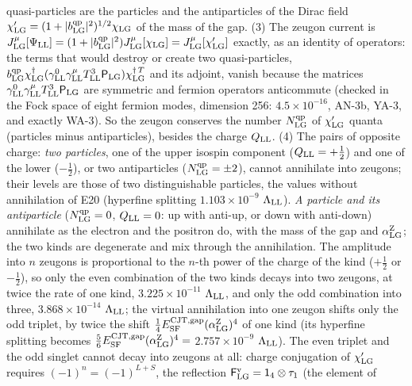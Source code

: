 \documentclass[
  10pt,
]{article}
\begin{document}
\begin{longtable}[]
quasi-particles are the particles and the antiparticles of the Dirac
field
\(\chi'_{\rm LG}=(1+\lvert b^{\rm qp}_{\rm LG}\rvert^2)^{1/2}\chi_{\rm LG}\)
of the mass of the gap. (3) The zeugon current is
\(J^\mu_{\rm LG}[\Psi_{\rm LL}]=(1+\lvert b^{\rm qp}_{\rm LG}\rvert^2)J^\mu_{\rm LG}[\chi_{\rm LG}]=J^\mu_{\rm LG}[\chi'_{\rm LG}]\)
exactly, as an identity of operators: the terms that would destroy or
create two quasi-particles,
\(b^{\rm qp}_{\rm LG}\chi_{\rm LG}^\dagger(\gamma^0_{\rm LL}\gamma^\mu_{\rm LL}T^3_{\rm LL}\mathsf P_{\rm LG})\chi_{\rm LG}^{\dagger\,T}\)
and its adjoint, vanish because the matrices
\(\gamma^0_{\rm LL}\gamma^\mu_{\rm LL}T^3_{\rm LL}\mathsf P_{\rm LG}\)
are symmetric and fermion operators anticommute (checked in the Fock
space of eight fermion modes, dimension 256: \(4.5\times10^{-16}\),
AN-3b, YA-3, and exactly WA-3). So the zeugon conserves the number
\(N^{\rm qp}_{\rm LG}\) of \(\chi'_{\rm LG}\) quanta (particles minus
antiparticles), besides the charge \(Q_{\rm LL}\). (4) The pairs of
opposite charge: \emph{two particles}, one of the upper isospin
component (\(Q_{\rm LL}=+\tfrac12\)) and one of the lower
(\(-\tfrac12\)), or two antiparticles (\(N^{\rm qp}_{\rm LG}=\pm2\)),
cannot annihilate into zeugons; their levels are those of two
distinguishable particles, the values without annihilation of E20
(hyperfine splitting \(1.103\times10^{-9}\) \(\Lambda_{\rm LL}\)).
\emph{A particle and its antiparticle} (\(N^{\rm qp}_{\rm LG}=0\),
\(Q_{\rm LL}=0\): up with anti-up, or down with anti-down) annihilate as
the electron and the positron do, with the mass of the gap and
\(\alpha^{\rm Z}_{\rm LG}\); the two kinds are degenerate and mix
through the annihilation. The amplitude into \(n\) zeugons is
proportional to the \(n\)-th power of the charge of the kind
(\(+\tfrac12\) or \(-\tfrac12\)), so only the even combination of the
two kinds decays into two zeugons, at twice the rate of one kind,
\(3.225\times10^{-11}\) \(\Lambda_{\rm LL}\), and only the odd
combination into three, \(3.868\times10^{-14}\) \(\Lambda_{\rm LL}\);
the virtual annihilation into one zeugon shifts only the odd triplet, by
twice the shift
\(\tfrac14E^{\rm CJT,gap}_{\rm SF}(\alpha^{\rm Z}_{\rm LG})^4\) of one
kind (its hyperfine splitting becomes
\(\tfrac56E^{\rm CJT,gap}_{\rm SF}(\alpha^{\rm Z}_{\rm LG})^4=\)
\(2.757\times10^{-9}\) \(\Lambda_{\rm LL}\)). The even triplet and the
odd singlet cannot decay into zeugons at all: charge conjugation of
\(\chi'_{\rm LG}\) requires \((-1)^n=(-1)^{L+S}\), the reflection
\(\mathsf F^{\rm v}_{\rm LG}=\mathsf 1_4\otimes\tau_1\) (the element of

\end{longtable}
\end{document}
